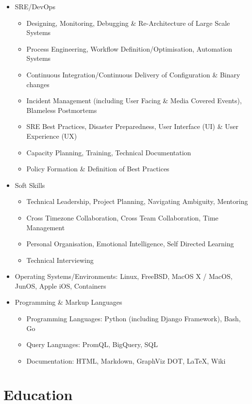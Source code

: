 \documentclass[a4paper, 10pt] {article}
\begin{document}
\begin{itemize}
\item SRE/DevOps
  \begin{itemize}
  \item Designing, Monitoring, Debugging \& Re-Architecture of Large Scale Systems
  \item Process Engineering, Workflow Definition/Optimisation, Automation Systems
  \item Continuous Integration/Continuous Delivery of Configuration \& Binary changes
  \item Incident Management (including User Facing \& Media Covered Events), Blameless Postmortems
  \item SRE Best Practices, Disaster Preparedness, User Interface (UI) \& User Experience (UX)
  \item Capacity Planning, Training, Technical Documentation
  \item Policy Formation \& Definition of Best Practices
  \end{itemize}
\item Soft Skills
  \begin{itemize}
  \item Technical Leadership, Project Planning, Navigating Ambiguity, Mentoring
  \item Cross Timezone Collaboration, Cross Team Collaboration, Time Management
  \item Personal Organisation, Emotional Intelligence, Self Directed Learning
  \item Technical Interviewing
  \end{itemize}
  \item Operating Systems/Environments: Linux, FreeBSD, MacOS X / MacOS, JunOS, Apple iOS, Containers
\item Programming \& Markup Languages
  \begin{itemize}
  \item Programming Languages: Python (including Django Framework), Bash, Go
  \item Query Languages: PromQL, BigQuery, SQL
  \item Documentation: HTML, Markdown, GraphViz DOT, \LaTeX, Wiki
  \end{itemize}
\end{itemize}  

\hrulefill

\section*{Education}
\end{document}

